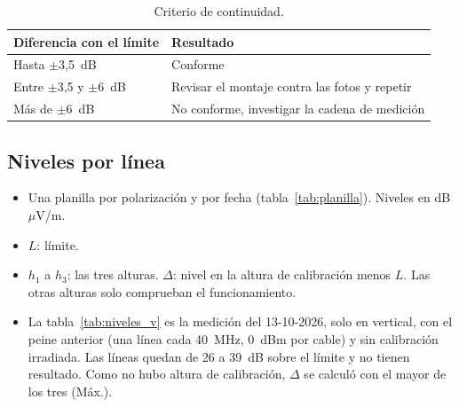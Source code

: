 \documentclass[11pt,a4paper]{article}
\begin{document}
\begin{table}[H]
  \centering
  \begin{tabular}{@{}ll@{}}
    \toprule
    Diferencia con el límite & Resultado \\
    \midrule
    Hasta $\pm$3,5~dB          & Conforme \\
    Entre $\pm$3,5 y $\pm$6~dB & Revisar el montaje contra las fotos y repetir \\
    Más de $\pm$6~dB           & No conforme, investigar la cadena de medición \\
    \bottomrule
  \end{tabular}
  \caption{Criterio de continuidad.}
\end{table}


\subsection{Niveles por línea}

\begin{itemize}
  \item Una planilla por polarización y por fecha (tabla~\ref{tab:planilla}). Niveles en dB$\mu$V/m.
  \item $L$: límite.
  \item $h_1$ a $h_3$: las tres alturas. $\Delta$: nivel en la altura de calibración menos $L$. Las otras alturas solo comprueban el funcionamiento.
  \item La tabla~\ref{tab:niveles_v} es la medición del 13-10-2026, solo en vertical, con el peine anterior (una línea cada 40~MHz, 0~dBm por cable) y sin calibración irradiada. Las líneas quedan de 26 a 39~dB sobre el límite y no tienen resultado. Como no hubo altura de calibración, $\Delta$ se calculó con el mayor de los tres (Máx.).
\end{itemize}
\end{document}
